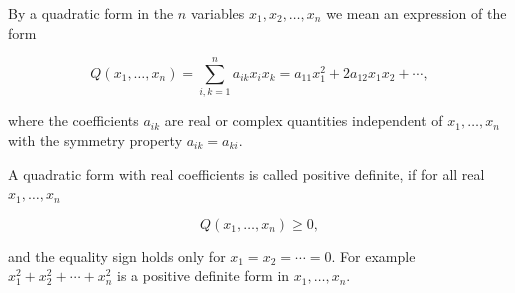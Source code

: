 By a quadratic form in the $n$ variables $x_1, x_2, \ldots, x_n$ we mean an expression of the form

$$Q(x_1, \ldots, x_n) = \sum_{i,k=1}^{n} a_{ik}x_i x_k = a_{11}x_1^2 + 2a_{12}x_1x_2 + \cdots,$$

where the coefficients $a_{ik}$ are real or complex quantities independent of $x_1, \ldots, x_n$ with the symmetry property $a_{ik} = a_{ki}$.

A quadratic form with real coefficients is called positive definite, if for all real $x_1, \ldots, x_n$

$$Q(x_1, \ldots, x_n) \geq 0,$$

and the equality sign holds only for $x_1 = x_2 = \cdots = 0$. For example $x_1^2 + x_2^2 + \cdots + x_n^2$ is a positive definite form in $x_1, \ldots, x_n$.
